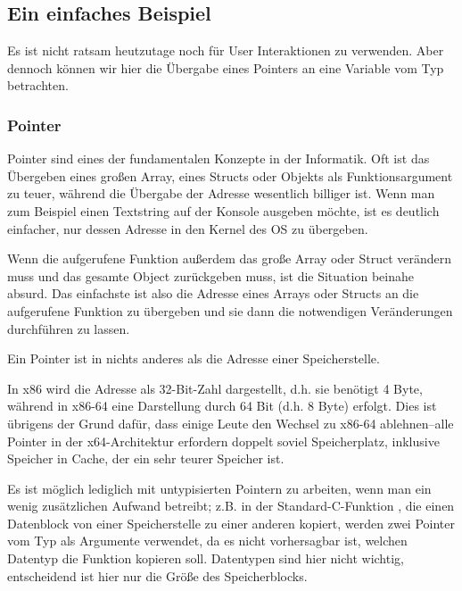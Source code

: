 \subsection{Ein einfaches Beispiel}



Es ist nicht ratsam \scanf heutzutage noch für User Interaktionen zu verwenden. Aber dennoch können wir hier die Übergabe eines Pointers an eine Variable vom Typ \Tint betrachten.

\subsubsection{Pointer}
\myindex{\CLanguageElements!\Pointers}
Pointer sind eines der fundamentalen Konzepte in der Informatik. Oft ist das Übergeben eines großen Array, eines Structs oder Objekts als Funktionsargument zu teuer, während die Übergabe der Adresse wesentlich billiger ist. 
Wenn man zum Beispiel einen Textstring auf der Konsole ausgeben möchte, ist es deutlich einfacher, nur dessen Adresse in den Kernel des \ac{OS} zu übergeben.

Wenn die aufgerufene Funktion außerdem das große Array oder Struct verändern muss und das gesamte Object zurückgeben muss, ist die Situation beinahe absurd. 
Das einfachste ist also die Adresse eines Arrays oder Structs an die aufgerufene Funktion zu übergeben und sie dann die notwendigen Veränderungen durchführen zu lassen.

Ein Pointer ist in \CCpp nichts anderes als die Adresse einer Speicherstelle.


In x86 wird die Adresse als 32-Bit-Zahl dargestellt, d.h. sie benötigt 4 Byte, während in x86-64 eine Darstellung durch 64 Bit (d.h. 8 Byte) erfolgt.
Dies ist übrigens der Grund dafür, dass einige Leute den Wechsel zu x86-64 ablehnen--alle Pointer in der x64-Architektur erfordern doppelt soviel Speicherplatz, inklusive Speicher in Cache, der ein sehr teurer Speicher ist.

Es ist möglich lediglich mit untypisierten Pointern zu arbeiten, wenn man ein wenig zusätzlichen Aufwand betreibt; z.B. in der Standard-C-Funktion , die einen Datenblock von einer Speicherstelle zu einer anderen kopiert, werden zwei Pointer vom Typ  als Argumente verwendet, da es nicht vorhersagbar ist, welchen Datentyp die Funktion kopieren soll. Datentypen sind hier nicht wichtig, entscheidend ist hier nur die Größe des Speicherblocks.

